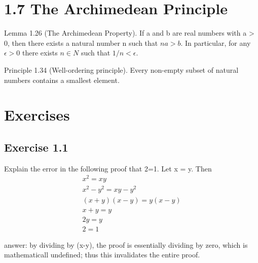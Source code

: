 \documentclass[12pt]{article}
\begin{document}
	\section*{1.7 The Archimedean Principle}
		Lemma 1.26 (The Archimedean Property). If a and b are real numbers with a > 0, then there exists a natural number n such that $na > b$. In particular, for any $\epsilon > 0$ there exists $n \in N$ such that $1/n < \epsilon$.
		
		Principle 1.34 (Well-ordering principle). Every non-empty subset of natural numbers contains a smallest element.
	\section*{Exercises}
		\subsection*{Exercise 1.1}
			Explain the error in the following proof that 2=1. Let x = y. Then
			\begin{equation}
				\begin{split}
					x^2 = xy \\
					x^2 - y^2 = xy - y^2 \\
					(x+y)(x-y) = y(x-y) \\
					x+y = y \\
					2y = y\\
					2 = 1
				\end{split}
			\end{equation}
			
			answer: by dividing by (x-y), the proof is essentially dividing by zero, which is mathematicall undefined; thus this invalidates the entire proof.
\end{document}
